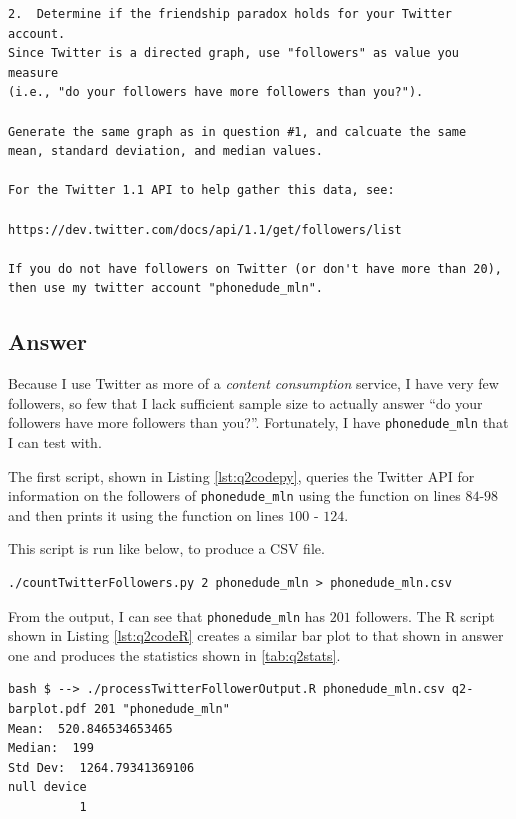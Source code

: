 \documentclass[letterpaper,11pt]{article}
\begin{document}
\begin{verbatim}
2.  Determine if the friendship paradox holds for your Twitter account.
Since Twitter is a directed graph, use "followers" as value you measure
(i.e., "do your followers have more followers than you?").

Generate the same graph as in question #1, and calcuate the same 
mean, standard deviation, and median values.

For the Twitter 1.1 API to help gather this data, see:

https://dev.twitter.com/docs/api/1.1/get/followers/list

If you do not have followers on Twitter (or don't have more than 20),
then use my twitter account "phonedude_mln".
\end{verbatim}

\newpage
\subsection*{Answer}

Because I use Twitter as more of a \emph{content consumption} service, I have very few followers, so few that I lack sufficient sample size to actually answer ``do your followers have more followers than you?''.  Fortunately, I have \verb+phonedude_mln+ that I can test with.

The first script, shown in Listing \ref{lst:q2codepy}, queries the Twitter API for information on the followers of \verb+phonedude_mln+ using the function on lines $84$-$98$ and then prints it using the function on lines $100$ - $124$.

This script is run like below, to produce a CSV file.
\begin{lstlisting}[frame=single]
./countTwitterFollowers.py 2 phonedude_mln > phonedude_mln.csv
\end{lstlisting}

From the output, I can see that \verb+phonedude_mln+ has $201$ followers.  The R script shown in Listing \ref{lst:q2codeR} creates a similar bar plot to that shown in answer one and produces the statistics shown in \ref{tab:q2stats}.

\begin{lstlisting}[frame=single]
bash $ --> ./processTwitterFollowerOutput.R phonedude_mln.csv q2-barplot.pdf 201 "phonedude_mln"
Mean:  520.846534653465
Median:  199
Std Dev:  1264.79341369106
null device 
          1 
\end{lstlisting}
\end{document}
